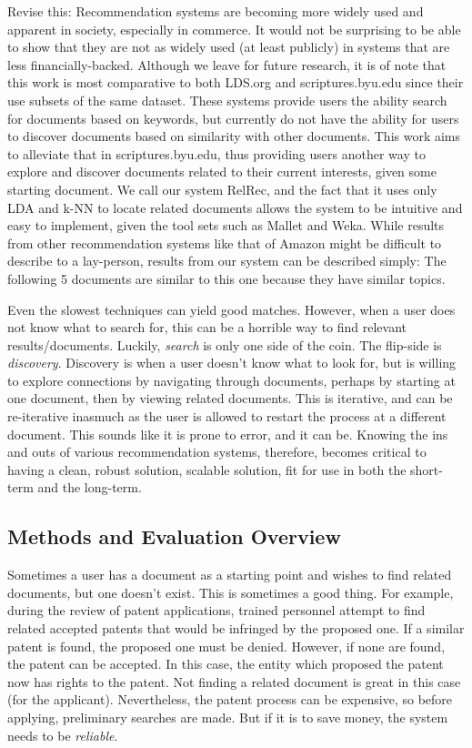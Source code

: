 Revise this:
Recommendation systems are becoming more widely used and apparent in society, especially in commerce. It would not be surprising to be able to show that they are not as widely used (at least publicly) in systems that are less financially-backed. Although we leave for future research, it is of note that this work is most comparative to both LDS.org and scriptures.byu.edu since their use subsets of the same dataset. These systems provide users the ability search for documents based on keywords, but currently do not have the ability for users to discover documents based on similarity with other documents. This work aims to alleviate that in scriptures.byu.edu, thus providing users another way to explore and discover documents related to their current interests, given some starting document. We call our system RelRec, and the fact that it uses only LDA and k-NN to locate related documents allows the system to be intuitive and easy to implement, given the tool sets such as Mallet and Weka. While results from other recommendation systems like that of Amazon might be difficult to describe to a lay-person, results from our system can be described simply: The following 5 documents are similar to this one because they have similar topics. 





Even the slowest techniques can yield good matches. However, when a user does not know what to search for, this can be a horrible way to find relevant results/documents. Luckily, \emph{search} is only one side of the coin. The flip-side is \emph{discovery}. Discovery is when a user doesn't know what to look for, but is willing to explore connections by navigating through documents, perhaps by starting at one document, then by viewing related documents. This is iterative, and can be re-iterative inasmuch as the user is allowed to restart the process at a different document. This sounds like it is prone to error, and it can be. Knowing the ins and outs of various recommendation systems, therefore, becomes critical to having a clean, robust solution, scalable solution, fit for use in both the short-term and the long-term.

\subsection {Methods and Evaluation Overview}
Sometimes a user has a document as a starting point and wishes to find related documents, but one doesn't exist. This is sometimes a good thing. For example, during the review of patent applications, trained personnel attempt to find related accepted patents that would be infringed by the proposed one. If a similar patent is found, the proposed one must be denied. However, if none are found, the patent can be accepted. In this case, the entity which proposed the patent now has rights to the patent. Not finding a related document is great in this case (for the applicant). Nevertheless, the patent process can be expensive, so before applying, preliminary searches are made. But if it is to save money, the system needs to be \emph{reliable}.


